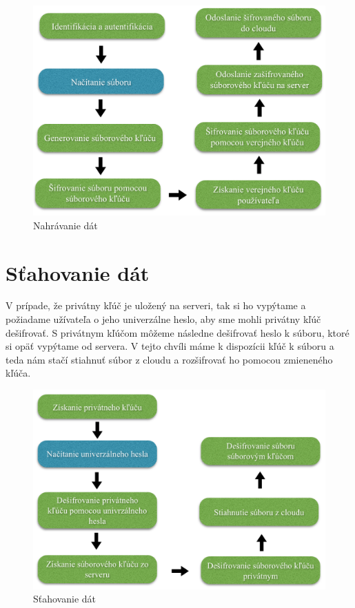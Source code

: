 		\begin{figure}[H]
			\begin{center}
				\includegraphics[width=1\linewidth]{images/nahravanie.png}
				\caption{Nahrávanie dát}
			\end{center}
		\end{figure}
				
	\section{Sťahovanie dát}
	
		V prípade, že privátny kľúč je uložený na serveri, tak si ho vypýtame a požiadame užívateľa o jeho univerzálne heslo, aby sme mohli privátny kľúč dešifrovať. S privátnym kľúčom môžeme následne dešifrovať heslo k súboru, ktoré si opäť vypýtame od servera. V tejto chvíli máme k dispozícii kľúč k súboru a teda nám stačí stiahnuť súbor z cloudu a rozšifrovať ho pomocou zmieneného kľúča. 
		
		\begin{figure}[H]
			\begin{center}
				\includegraphics[width=1\linewidth]{images/stahovanie.png}
				\caption{Sťahovanie dát}
			\end{center}
		\end{figure}	
		
